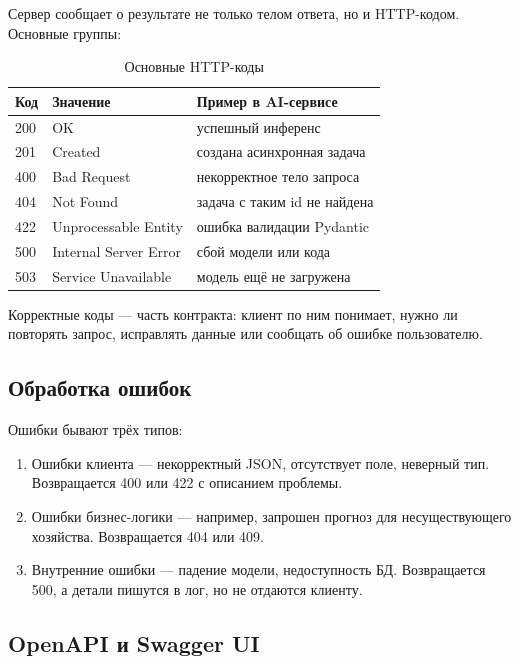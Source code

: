 \documentclass[12pt,a4paper]{article}
\begin{document}
Сервер сообщает о результате не только телом ответа, но и HTTP-кодом. Основные группы:

\begin{table}[H]
\centering
\caption{Основные HTTP-коды}
\label{tab:http_codes}
\begin{tabular}{|l|l|l|}
\hline
\textbf{Код} & \textbf{Значение} & \textbf{Пример в AI-сервисе} \\
\hline
200 & OK                    & успешный инференс \\
201 & Created               & создана асинхронная задача \\
400 & Bad Request           & некорректное тело запроса \\
404 & Not Found             & задача с таким id не найдена \\
422 & Unprocessable Entity  & ошибка валидации Pydantic \\
500 & Internal Server Error & сбой модели или кода \\
503 & Service Unavailable   & модель ещё не загружена \\
\hline
\end{tabular}
\end{table}

Корректные коды — часть контракта: клиент по ним понимает, нужно ли повторять запрос, исправлять данные или сообщать об ошибке пользователю.

\subsection{Обработка ошибок}

Ошибки бывают трёх типов:

\begin{enumerate}
    \item Ошибки клиента — некорректный JSON, отсутствует поле, неверный тип. Возвращается 400 или 422 с описанием проблемы.
    \item Ошибки бизнес-логики — например, запрошен прогноз для несуществующего хозяйства. Возвращается 404 или 409.
    \item Внутренние ошибки — падение модели, недоступность БД. Возвращается 500, а детали пишутся в лог, но не отдаются клиенту.
\end{enumerate}

\subsection{OpenAPI и Swagger UI}
\end{document}
